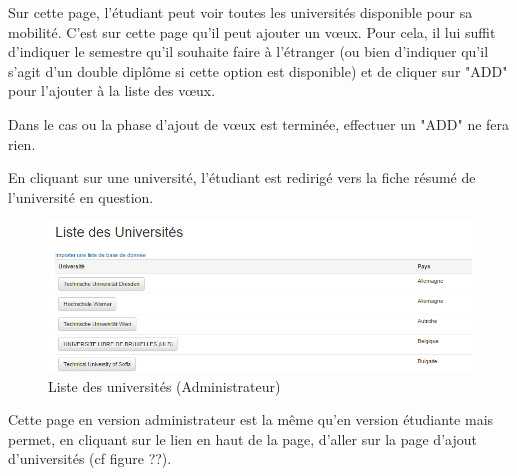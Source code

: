 Sur cette page, l'étudiant peut voir toutes les universités disponible pour sa mobilité. C'est sur cette page qu'il peut ajouter un vœux. Pour cela, il lui suffit d'indiquer le semestre qu'il souhaite faire à l'étranger (ou bien d'indiquer qu'il s'agit d'un double diplôme si cette option est disponible) et de cliquer sur "ADD" pour l'ajouter à la liste des vœux.

\bigbreak

Dans le cas ou la phase d'ajout de vœux est terminée, effectuer un "ADD" ne fera rien.

\bigbreak

En cliquant sur une université, l'étudiant est redirigé vers la fiche résumé de l'université en question.

\begin{figure}[H]
	\includegraphics[scale=0.7]{images/LUA.png}
	\caption{Liste des universités  (Administrateur)}
	\label{fig::lua}
\end{figure}

Cette page en version administrateur est la même qu'en version étudiante mais permet, en cliquant sur le lien en haut de la page, d'aller sur la page d'ajout d'universités (cf figure ??). 